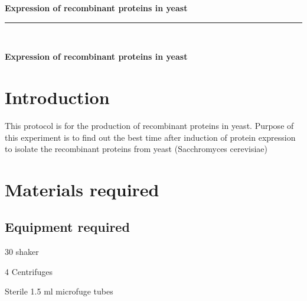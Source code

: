 \documentclass[a4paper,12pt]{article}
\newcommand{\protocol}{Expression of recombinant proteins in yeast}
\newenvironment{packed_enum}{
\begin{enumerate}
  \setlength{\itemsep}{1pt}
  \setlength{\parskip}{0pt}
  \setlength{\parsep}{0pt}
}{\end{enumerate}}
\begin{document}
 
 
 
\begin{titlepage}
\begin{center}
{\LARGE \textbf{ \protocol} \\ \vspace{4pt}}
\rule[13pt]{\textwidth}{1pt} \\ \vspace{150pt}
\end{center}
 
\end{titlepage}
 
\newpage
\thispagestyle{empty}           %
{\LARGE \textbf{ \protocol} \\ \vspace{4pt}}
\tableofcontents
\clearpage                      %
 
\setcounter{page}{1}
 
\section{Introduction}
This protocol is for the production of recombinant proteins in yeast. Purpose of this experiment is to find out the best time after induction of protein expression to isolate the recombinant proteins from yeast (Sacchromyces cerevisiae)
\section{Materials required}

		\subsection{Equipment required}
			\begin{packed_enum}
				\item 30{\textcelsius} shaker
				\item 4{\textcelsius} Centrifuges
				\item Sterile 1.5 ml microfuge tubes
			\end{packed_enum}
 
\end{document}
